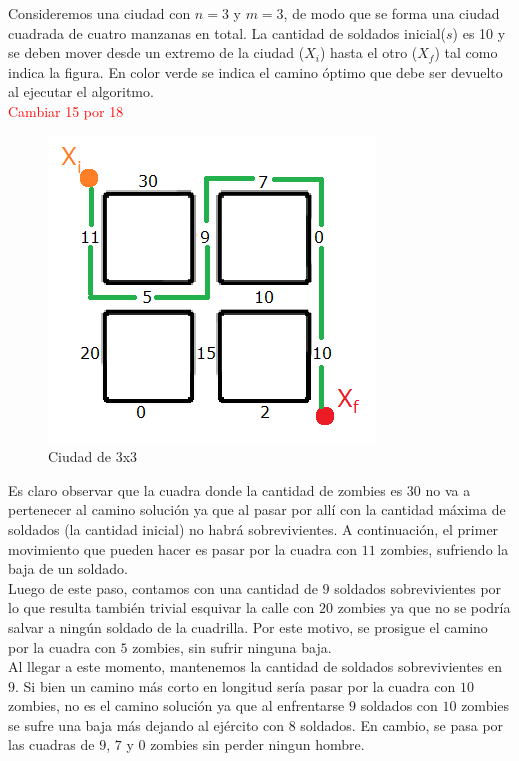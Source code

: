 Consideremos una ciudad con $n=3$ y $m=3$, de modo que se forma una ciudad cuadrada de cuatro manzanas en total. La cantidad de soldados inicial($s$) es 10 y se deben mover desde un extremo de la ciudad ($X_i$) hasta el otro ($X_f$) tal como indica la figura. En color verde se indica el camino \'optimo que debe ser devuelto al ejecutar el algoritmo.\\

\textcolor{red}{Cambiar 15 por 18}

  \begin{figure}[h!]
   \begin{center}
 	\includegraphics[scale=0.7]{imagenes/ej2/cuadras.png}
 	\caption{Ciudad de 3x3}
 	\label{ejemplitoCiudad}
   \end{center}
 \end{figure}

\newpage

Es claro observar que la cuadra donde la cantidad de zombies es $30$ no va a pertenecer al camino soluci\'on ya que al pasar por all\'i con la cantidad m\'axima de soldados (la cantidad inicial) no habr\'a sobrevivientes. A continuaci\'on, el primer movimiento que pueden hacer es pasar por la cuadra con $11$ zombies, sufriendo la baja de un soldado.\\

Luego de este paso, contamos con una cantidad de $9$ soldados sobrevivientes por lo que resulta tambi\'en trivial esquivar la calle con $20$ zombies ya que no se podr\'ia salvar a ning\'un soldado de la cuadrilla. Por este motivo, se prosigue el camino por la cuadra con $5$ zombies, sin sufrir ninguna baja.\\

Al llegar a este momento, mantenemos la cantidad de soldados sobrevivientes en $9$. Si bien un camino m\'as corto en longitud ser\'ia pasar por la cuadra con $10$ zombies, no es el camino soluci\'on ya que al enfrentarse $9$ soldados con $10$ zombies se sufre una baja m\'as dejando al ej\'ercito con $8$ soldados. En cambio, se pasa por las cuadras de $9$, $7$ y $0$ zombies sin perder ningun hombre.\\


